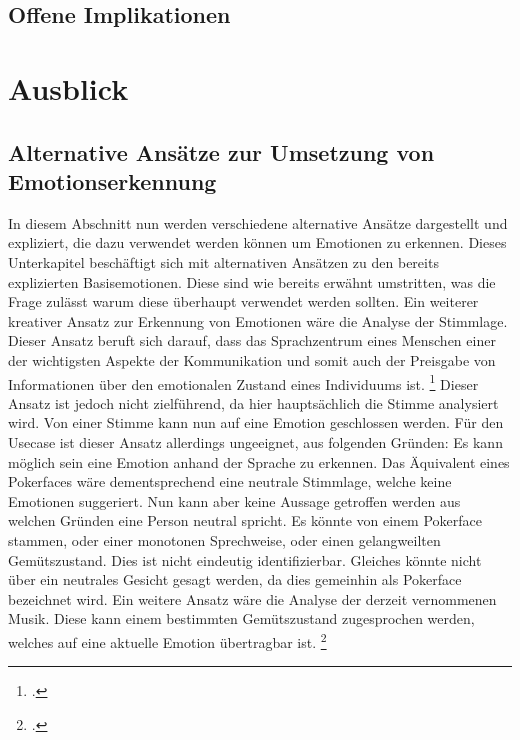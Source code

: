 \documentclass[12pt, a4paper]{scrbook}
\begin{document}
\section{Offene Implikationen}





\chapter{Ausblick}


\section{Alternative Ansätze zur Umsetzung von Emotionserkennung}

In diesem Abschnitt nun werden verschiedene alternative Ansätze dargestellt und expliziert, die dazu verwendet werden können um Emotionen zu erkennen.
Dieses Unterkapitel beschäftigt sich mit alternativen Ansätzen zu den bereits explizierten Basisemotionen. Diese sind wie bereits erwähnt umstritten, was die Frage zulässt warum diese überhaupt
verwendet werden sollten. Ein weiterer kreativer Ansatz zur Erkennung von Emotionen wäre die Analyse der Stimmlage.
Dieser Ansatz beruft sich darauf, dass das Sprachzentrum eines Menschen einer der wichtigsten Aspekte der Kommunikation und somit auch der Preisgabe von Informationen über den emotionalen Zustand eines Individuums ist.
\footcite[Vgl. ][Abstract]{EmotionInSpeech}
Dieser Ansatz ist jedoch nicht zielführend, da hier hauptsächlich die Stimme analysiert wird. Von einer Stimme kann nun auf eine Emotion geschlossen werden. Für den Usecase ist dieser Ansatz allerdings ungeeignet, aus folgenden Gründen:
\newline
Es kann möglich sein eine Emotion anhand der Sprache zu erkennen. Das Äquivalent eines Pokerfaces wäre dementsprechend eine neutrale Stimmlage, welche keine Emotionen suggeriert. Nun kann aber keine Aussage getroffen werden aus welchen Gründen eine Person neutral spricht. Es könnte von einem Pokerface stammen, oder einer monotonen Sprechweise, oder einen gelangweilten Gemütszustand. Dies ist nicht eindeutig identifizierbar. Gleiches könnte nicht über ein neutrales Gesicht gesagt werden, da dies gemeinhin als Pokerface bezeichnet wird. %
Ein weitere Ansatz wäre die Analyse der derzeit vernommenen Musik. Diese kann einem bestimmten Gemütszustand zugesprochen werden, welches auf eine aktuelle Emotion übertragbar ist.
\footcite[Vgl.][1]{MusicEmotion}
\end{document}
